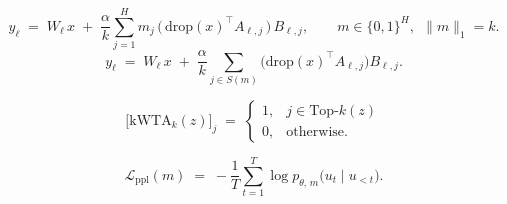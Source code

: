 

\newcommand{\kwta}{\mathrm{kWTA}_k}
\newcommand{\sg}{\mathrm{sg}}        %
\newcommand{\softmax}{\mathrm{softmax}}

\begin{equation}
  y_\ell \;=\; W_\ell\, x \;+\; \frac{\alpha}{k}
  \sum_{j=1}^{H} m_j \,\bigl(\,\mathrm{drop}(x)^{\!\top} A_{\ell,j}\,\bigr)\, B_{\ell,j},
  \qquad m \in \{0,1\}^{H},\ \ \|m\|_1 = k .
\end{equation}
\begin{equation}
  y_\ell \;=\; W_\ell\, x \;+\; \frac{\alpha}{k}
  \sum_{j \in S(m)} \bigl(\mathrm{drop}(x)^{\!\top} A_{\ell,j}\bigr) B_{\ell,j}.
\end{equation}

\begin{equation}
  \bigl[\kwta(z)\bigr]_j \;=\;
  \begin{cases}
    1, & j \in \mathrm{Top}\text{-}k(z) \\
    0, & \text{otherwise.}
  \end{cases}
\end{equation}

\begin{equation}
  \mathcal{L}_{\mathrm{ppl}}(m) \;=\;
  -\frac{1}{T}\sum_{t=1}^{T} \log p_{\theta,\,m}\!\bigl(u_t \mid u_{<t}\bigr).
\end{equation}

